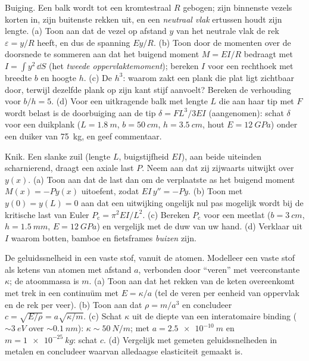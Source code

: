 \begin{exercise}[$\star\star\star$]\label{exo:b3:continuum-elasticity:10}
Buiging. Een balk wordt tot een kromtestraal $R$ gebogen; zijn binnenste
vezels korten in, zijn buitenste rekken uit, en een \emph{neutraal vlak}
ertussen houdt zijn lengte. (a) Toon aan dat de vezel op afstand $y$ van
het neutrale vlak de rek $\varepsilon = y/R$ heeft, en dus de spanning
$Ey/R$. (b) Toon door de momenten over de doorsnede te sommeren aan dat
het buigend moment $M = EI/R$ bedraagt met $I = \int y^2\,\dd S$ (het
\emph{tweede oppervlaktemoment}); bereken $I$ voor een rechthoek met
breedte $b$ en hoogte $h$. (c) De $h^3$: waarom zakt een plank die plat
ligt zichtbaar door, terwijl dezelfde plank op zijn kant stijf aanvoelt?
Bereken de verhouding voor $b/h = 5$. (d) Voor een uitkragende balk met
lengte $L$ die aan haar tip met $F$ wordt belast is de doorbuiging aan de
tip $\delta = FL^3/3EI$ (aangenomen): schat $\delta$ voor een duikplank
($L = \qty{1.8}{m}$, $b = \qty{50}{cm}$, $h = \qty{3.5}{cm}$, hout $E
= \qty{12}{GPa}$) onder een duiker van \qty{75}{kg}, en geef commentaar.
\end{exercise}

\begin{exercise}[$\star\star\star$]\label{exo:b3:continuum-elasticity:11}
Knik. Een slanke zuil (lengte $L$, buigstijfheid $EI$), aan beide
uiteinden scharnierend, draagt een axiale last $P$. Neem aan dat zij
zijwaarts uitwijkt over $y(x)$. (a) Toon aan dat de last dan om de
verplaatste as het buigend moment $M(x) = -Py(x)$ uitoefent, zodat
$EI\,y'' = -Py$. (b) Toon met $y(0) = y(L) = 0$ aan dat een uitwijking
ongelijk nul pas mogelijk wordt bij de kritische last van Euler
$P_{\text{c}} = \pi^2EI/L^2$. (c) Bereken $P_{\text{c}}$ voor een
meetlat ($b = \qty{3}{cm}$, $h = \qty{1.5}{mm}$, $E = \qty{12}{GPa}$) en
vergelijk met de duw van uw hand. (d) Verklaar uit $I$ waarom botten,
bamboe en fietsframes \emph{buizen} zijn.
\end{exercise}

\begin{exercise}[$\star\star\star$]\label{exo:b3:continuum-elasticity:12}
De geluidssnelheid in een vaste stof, vanuit de atomen. Modelleer een
vaste stof als ketens van atomen met afstand $a$, verbonden door
``veren'' met veerconstante $\kappa$; de atoommassa is $m$. (a) Toon aan
dat het rekken van de keten overeenkomt met trek in een continuüm met $E = \kappa/a$ (tel de veren per eenheid van oppervlak en de rek per veer).
(b) Toon aan dat $\rho = m/a^3$ en concludeer $c =
\sqrt{E/\rho} = a\sqrt{\kappa/m}$. (c) Schat $\kappa$ uit de diepte van een
interatomaire binding ($\sim\qty{3}{eV}$ over $\sim
\qty{0.1}{nm}$):
$\kappa \sim \qty{50}{N/m}$; met $a =
\qty{2.5e-10}{m}$ en $m = \qty{1e-25}{kg}$: schat $c$. (d) Vergelijk met gemeten geluidssnelheden in metalen
en concludeer waarvan alledaagse elasticiteit gemaakt is.
\end{exercise}


